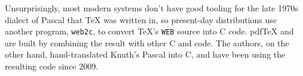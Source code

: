 Unsurprisingly, most modern systems don't have good tooling for the late 1970s
dialect of Pascal that \TeX{} was written in,
so present-day distributions use another program,
\texttt{web2c}, to convert \TeX{}'s \texttt{WEB} source into C code.
pdf\TeX{} and \XeTeX{} are built by combining the result with other C
and \cpp{} code.
The \LuaTeX{} authors, on the other hand, hand-translated Knuth's Pascal into C,
and have been using the resulting code since 2009.\punckern{}

